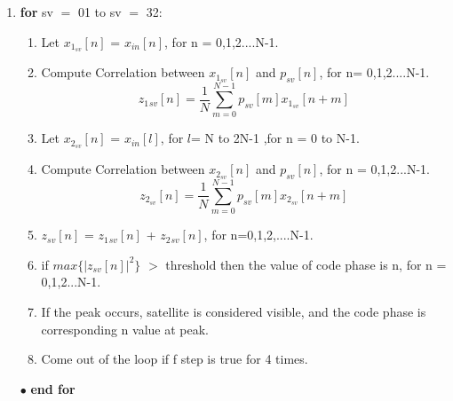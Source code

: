 \documentclass[journal,10pt,onecolumn]{article}
\begin{document}
\begin{enumerate}
    \item \textbf{for} sv $=$ 01 to sv $=$ 32:
    \begin{enumerate}
        \item Let $x_{1_{sv}}[n]$ = $x_{in}[n]$, for n = 0,1,2....N-1.
        \item Compute Correlation between $x_{1_{sv}}[n]$ and $p_{sv}[n]$, for n= 0,1,2....N-1.
        \begin{equation}
            z_1{_{sv}}[n] = \frac{1}{N}\sum_{m = 0}^{N-1}p_{sv}[m]x_{1_{sv}}[n+m]
        \end{equation} 
        \item Let $x_{2_{sv}}[n]$ = $x_{in}[l]$, for $l$= N to 2N-1 ,for n = 0 to N-1.
        \item Compute Correlation between $x_{2_{sv}}[n]$ and $p_{sv}[n]$, for n = 0,1,2...N-1.
        \begin{equation}
            z_{2_{sv}}[n] = \frac{1}{N}\sum_{m = 0}^{N-1}p_{sv}[m]x_{2_{sv}}[n+m]
        \end{equation} 
        \item $z_{sv}[n]$ = $z_1{_{sv}}[n]$ + $z_2{_{sv}}[n]$, for n=0,1,2,....N-1.
        \item if $max\{ \left\lvert z_{sv}[n] \right\rvert^2\}$ $>$ threshold then the value of code phase is n, for n = 0,1,2...N-1.
        \item If the peak occurs, satellite is considered visible, and the code phase is corresponding n value at peak.  
        \item Come out of the loop if f step is true for 4 times.         
    \end{enumerate}
    \item[$\bullet$]\textbf{end for}
    



\end{enumerate}
\end{document}
